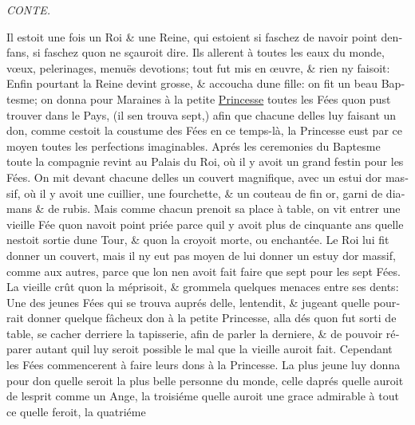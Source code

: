 \documentclass[14pt,a4paper]{memoir}
\newcommand{\ul}[1]{\uline{#1}}
\begin{document}
\begin{otherlanguage}{french}
\emph{CONTE.}

Il estoit une fois un Roi \& une Reine, qui estoient si faschez de
n\textquotesingle avoir point d\textquotesingle enfans, si faschez
qu\textquotesingle on ne sçauroit dire. Ils allerent à toutes les eaux
du monde, vœux, pelerinages, menuës devotions; tout fut mis en œuvre, \&
rien n\textquotesingle y faisoit: Enfin pourtant la Reine devint grosse,
\& accoucha d\textquotesingle une fille: on fit un beau Baptesme; on
donna pour Maraines à la petite \ul{Princesse} toutes les Fées
qu\textquotesingle on pust trouver dans le Pays, (il
s\textquotesingle en trouva sept,) afin que chacune
d\textquotesingle elles luy faisant un don, comme
c\textquotesingle estoit la coustume des Fées en ce temps-là, la
Princesse eust par ce moyen toutes les perfections imaginables. Aprés
les ceremonies du Baptesme toute la compagnie revint au Palais du Roi,
où il y avoit un grand festin pour les Fées. On mit devant chacune
d\textquotesingle elles un couvert magnifique, avec un estui
d\textquotesingle or massif, où il y avoit une cuillier, une fourchette,
\& un couteau de fin or, garni de diamans \& de rubis. Mais comme chacun
prenoit sa place à table, on vit entrer une vieille Fée
qu\textquotesingle on n\textquotesingle avoit point priée parce
qu\textquotesingle il y avoit plus de cinquante ans
qu\textquotesingle elle n\textquotesingle estoit sortie
d\textquotesingle une Tour, \& qu\textquotesingle on la croyoit morte,
ou enchantée. Le Roi lui fit donner un couvert, mais il
n\textquotesingle y eut pas moyen de lui donner un estuy
d\textquotesingle or massif, comme aux autres, parce que
l\textquotesingle on n\textquotesingle en avoit fait faire que sept pour
les sept Fées. La vieille crût qu\textquotesingle on la méprisoit, \&
grommela quelques menaces entre ses dents: Une des jeunes Fées qui se
trouva auprés d\textquotesingle elle, l\textquotesingle entendit, \&
jugeant qu\textquotesingle elle pourrait donner quelque fâcheux don à la
petite Princesse, alla dés qu\textquotesingle on fut sorti de table, se
cacher derriere la tapisserie, afin de parler la derniere, \& de pouvoir
réparer autant qu\textquotesingle il luy seroit possible le mal que la
vieille auroit fait. Cependant les Fées commencerent à faire leurs dons
à la Princesse. La plus jeune luy donna pour don qu\textquotesingle elle
seroit la plus belle personne du monde, celle d\textquotesingle aprés
qu\textquotesingle elle auroit de l\textquotesingle esprit comme un
Ange, la troisiéme qu\textquotesingle elle auroit une grace admirable à
tout ce qu\textquotesingle elle feroit, la quatriéme

\end{otherlanguage}
\end{document}
